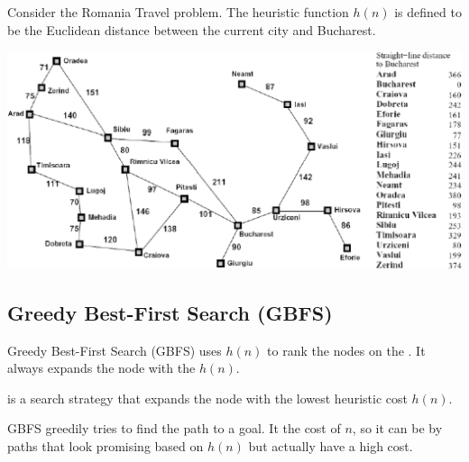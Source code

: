 \begin{example}
    Consider the Romania Travel problem. The heuristic function $h(n)$ is defined to be the Euclidean distance between the current city and Bucharest.

    \begin{center}
        \includegraphics[width=0.67\linewidth]{figures/heuristic-function.png}
    \end{center}
\end{example}

\subsection{Greedy Best-First Search (GBFS)}

Greedy Best-First Search (GBFS) uses $h(n)$ to rank the nodes on the \Frontier. It always expands the node with the  $h(n)$.

\begin{definition}\label{def:gbfs}
     is a search strategy that expands the node with the lowest heuristic cost $h(n)$.
\end{definition}

GBFS greedily tries to find the  path to a goal. It  the cost of $n$, so it can be  by paths that look promising based on $h(n)$ but actually have a high cost.

\begin{center}
    \tikzexternalenable
\end{center}

